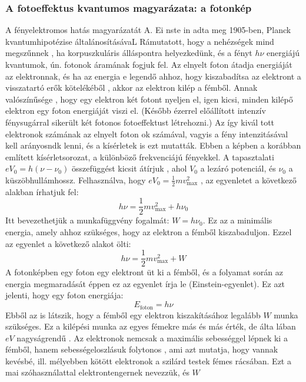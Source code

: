 \documentclass[../main.tex]{subfiles}
\begin{document}
\subsubsection{A fotoeffektus kvantumos magyarázata: a fotonkép}
A fényelektromos hatás magyarázatát A. Ei nste in adta meg 1905-ben, Planck kvantumhipotézise általánosításávaL Rámutatott, hogy a nehézségek mind megszűnnek , ha korpuszkuláris álláspontra helyezkedünk, és a fényt
$h \nu$ energiájú kvantumok, ún. fotonok áramának fogjuk fel. Az elnyelt foton átadja energiáját az elektronnak, és ha az energia e legendő ahhoz, hogy kiszabadítsa az elektront a visszatartó erők kötelékéből , akkor az elektron
kilép a fémből. Annak valószínűsége , hogy egy elektron két fotont nyeljen el, igen kicsi, minden kilépő elektron egy foton energiáját viszi el. (Később ézerrel előállított intenzív fénysugárral sikerült két fotonos fotoeffektust
létrehozni.) Az így kivál tott elektronok számának az elnyelt foton ok számával, vagyis a fény intenzitásával kell arányosndk lenni, és a kísérletek is ezt mutatták. Ebben a képben a korábban említett kísérletsorozat, a különböző
frekvenciájú fényekkel. A tapasztalati $eV_0 = h(\nu - \nu_0)$ összefüggést kicsit átírjuk , ahol $V_0$ a lezáró potenciál, és $\nu_0$ a küszöbhullámhossz.
Felhasználva, hogy $eV_0 = \frac{1}{2} mv_{\text{max}}^2$ , az egyenletet a következő alakban írhatjuk fel:
\begin{equation}
    h \nu = \frac{1}{2} mv_{\text{max}}^2 + h \nu_0
\end{equation}
Itt bevezethetjük a munkafüggvény fogalmát: $W = h \nu_0$. Ez az a minimális energia, amely ahhoz szükséges, hogy az elektron a fémből kiszabaduljon. Ezzel az egyenlet a következő alakot ölti:
\begin{equation}
    h \nu = \frac{1}{2} mv_{\text{max}}^2 + W
\end{equation}
A fotonképben egy foton egy elektront üt ki a fémből, és a folyamat során az energia megmaradását éppen ez az egyenlet írja le (Einstein-egyenlet). Ez azt jelenti, hogy egy foton energiája:
\begin{equation}
    E_{\text{foton}} = h \nu
\end{equation}
Ebből az is látszik, hogy a fémből egy elektron kiszakításához legalább $W$ munka szükséges. Ez a kilépési munka az egyes fémekre más és más érték, de
álta lában $eV$ nagyságrendű . Az elektronok nemcsak a maximális sebességgel lépnek ki a fémből, hanem sebességeloszlásuk folytonos , ami azt mutatja,
hogy vannak kevésbé, ill. mélyebben kötött elektronok a szilárd testek fémes rácsában. Ezt a mai szóhasználattal elektrontengernek nevezzük, és $W$
\end{document}
